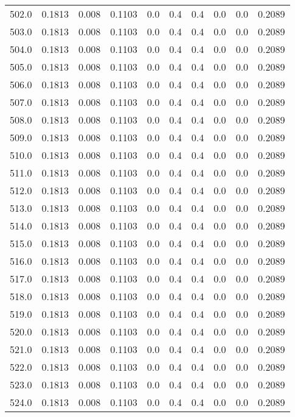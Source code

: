 \begin{longtable}{lrrrrrrrrr}
502.0 & 0.1813 & 0.008 & 0.1103 & 0.0 & 0.4 & 0.4 & 0.0 & 0.0 & 0.2089 \\
503.0 & 0.1813 & 0.008 & 0.1103 & 0.0 & 0.4 & 0.4 & 0.0 & 0.0 & 0.2089 \\
504.0 & 0.1813 & 0.008 & 0.1103 & 0.0 & 0.4 & 0.4 & 0.0 & 0.0 & 0.2089 \\
505.0 & 0.1813 & 0.008 & 0.1103 & 0.0 & 0.4 & 0.4 & 0.0 & 0.0 & 0.2089 \\
506.0 & 0.1813 & 0.008 & 0.1103 & 0.0 & 0.4 & 0.4 & 0.0 & 0.0 & 0.2089 \\
507.0 & 0.1813 & 0.008 & 0.1103 & 0.0 & 0.4 & 0.4 & 0.0 & 0.0 & 0.2089 \\
508.0 & 0.1813 & 0.008 & 0.1103 & 0.0 & 0.4 & 0.4 & 0.0 & 0.0 & 0.2089 \\
509.0 & 0.1813 & 0.008 & 0.1103 & 0.0 & 0.4 & 0.4 & 0.0 & 0.0 & 0.2089 \\
510.0 & 0.1813 & 0.008 & 0.1103 & 0.0 & 0.4 & 0.4 & 0.0 & 0.0 & 0.2089 \\
511.0 & 0.1813 & 0.008 & 0.1103 & 0.0 & 0.4 & 0.4 & 0.0 & 0.0 & 0.2089 \\
512.0 & 0.1813 & 0.008 & 0.1103 & 0.0 & 0.4 & 0.4 & 0.0 & 0.0 & 0.2089 \\
513.0 & 0.1813 & 0.008 & 0.1103 & 0.0 & 0.4 & 0.4 & 0.0 & 0.0 & 0.2089 \\
514.0 & 0.1813 & 0.008 & 0.1103 & 0.0 & 0.4 & 0.4 & 0.0 & 0.0 & 0.2089 \\
515.0 & 0.1813 & 0.008 & 0.1103 & 0.0 & 0.4 & 0.4 & 0.0 & 0.0 & 0.2089 \\
516.0 & 0.1813 & 0.008 & 0.1103 & 0.0 & 0.4 & 0.4 & 0.0 & 0.0 & 0.2089 \\
517.0 & 0.1813 & 0.008 & 0.1103 & 0.0 & 0.4 & 0.4 & 0.0 & 0.0 & 0.2089 \\
518.0 & 0.1813 & 0.008 & 0.1103 & 0.0 & 0.4 & 0.4 & 0.0 & 0.0 & 0.2089 \\
519.0 & 0.1813 & 0.008 & 0.1103 & 0.0 & 0.4 & 0.4 & 0.0 & 0.0 & 0.2089 \\
520.0 & 0.1813 & 0.008 & 0.1103 & 0.0 & 0.4 & 0.4 & 0.0 & 0.0 & 0.2089 \\
521.0 & 0.1813 & 0.008 & 0.1103 & 0.0 & 0.4 & 0.4 & 0.0 & 0.0 & 0.2089 \\
522.0 & 0.1813 & 0.008 & 0.1103 & 0.0 & 0.4 & 0.4 & 0.0 & 0.0 & 0.2089 \\
523.0 & 0.1813 & 0.008 & 0.1103 & 0.0 & 0.4 & 0.4 & 0.0 & 0.0 & 0.2089 \\
524.0 & 0.1813 & 0.008 & 0.1103 & 0.0 & 0.4 & 0.4 & 0.0 & 0.0 & 0.2089 \\

\end{longtable}
